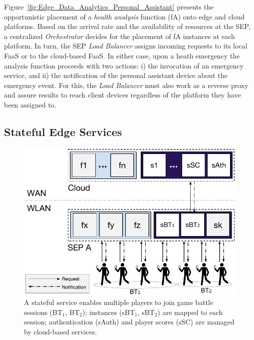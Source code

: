 \documentclass[letterpaper, 10 pt, conference]{ieeeconf}  %
\begin{document}
Figure~\ref{fig:Edge_Data_Analytics_Personal_Assistant} presents the opportunistic placement of a \textit{health analysis} function (fA) onto edge and cloud platforms. Based on the arrival rate and the availability of resources at the SEP, a centralized \textit{Orchestrator} decides for the placement of fA instances at each platform. In turn, the SEP \textit{Load Balancer} assigns incoming requests to its local FaaS or to the cloud-based FaaS. In either case, upon a heath emergency the analysis function proceeds with two actions: i) the invocation of an emergency service, and ii) the notification of the personal assistant device about the emergency event. For this, the \textit{Load Balancer} must also work as a reverse proxy and assure results to reach client devices regardless of the platform they have been assigned to.




\subsection{Stateful Edge Services}

\begin{figure}[tbp]
	\centering
	\includegraphics[width=\linewidth]{Figs/Stateful_Edge_Services.pdf}
	\caption{A stateful service enables multiple players to join game battle sessions (BT$_1$, BT$_2$); instances (sBT$_1$, sBT$_2$) are mapped to each session; authentication (sAuth) and player scores (sSC) are managed by cloud-based services.}
	\label{fig:Steteful_Edge_MMG}
\end{figure}
\end{document}
